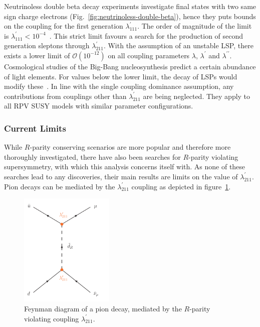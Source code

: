 Neutrinoless double beta decay experiments investigate final states with two same sign charge electrons (Fig.~\ref{fig:neutrinoless-double-beta}), hence they puts bounds on the coupling for the first generation $\lambda^\prime_{111}$. The order of magnitude of the limit is  $\lambda^\prime_{111} < 10^{-4}$~\cite{rpvimpl}. This strict limit favours a search for the production of second generation sleptons through $\lambda^\prime_{211}$. With the assumption of an unstable LSP, there exists a lower limit of $\mathcal{O}(10^{-12})$ on all coupling parameters $\lambda$, $\lambda^\prime$ and $\lambda^{\prime\prime}$. Cosmological studies of the Big-Bang nucleosynthesis predict a certain abundance of light elements. For values below the lower limit, the decay of LSPs would modify these~\cite{rpvimpl}. In line with the single coupling dominance assumption, any contributions from couplings other than $\lambda^\prime_{211}$ are being neglected. They apply to all RPV SUSY models with similar parameter configurations.

\subsubsection{Current Limits}

While $R$-parity conserving scenarios are more popular and therefore more thoroughly investigated, there have also been searches for $R$-parity violating supersymmetry, with which this analysis concerns itself with. As none of these searches lead to any discoveries, their main results are limits on the value of $\lambda^\prime_{211}$. Pion decays can be mediated by the $\lambda^\prime_{211}$ coupling as depicted in figure~\ref{fig:pion-lambda-prime-211}.

\begin{figure}[!htb]
  \centering
  \includegraphics[width=0.4\textwidth]{plots/pion-lambda-prime-211.pdf}
  \caption{Feynman diagram of a pion decay, mediated by the $R$-parity violating coupling $\lambda^\prime_{211}$.}
  \label{fig:pion-lambda-prime-211}
\end{figure}

